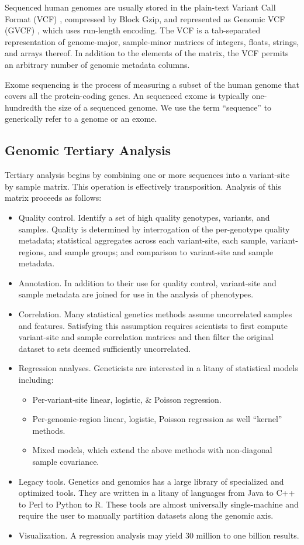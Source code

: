 \documentclass[sigconf, nonacm]{acmart}
\begin{document}
Sequenced human genomes are usually stored in the plain-text Variant Call Format (VCF) \cite{vcf4.3},
compressed by Block Gzip, and represented as Genomic VCF (GVCF) \cite{gvcf}, which uses run-length
encoding. The VCF is a tab-separated representation of genome-major, sample-minor matrices of
integers, floats, strings, and arrays thereof. In addition to the elements of the matrix, the VCF
permits an arbitrary number of genomic metadata columns.

Exome sequencing is the process of measuring a subset of the human genome that covers all the
protein-coding genes. An sequenced exome is typically one-hundredth the size of a sequenced
genome. We use the term ``sequence'' to generically refer to a genome or an exome.

\subsection{Genomic Tertiary Analysis}

Tertiary analysis begins by combining one or more sequences into a variant-site by sample
matrix. This operation is effectively transposition. Analysis of this matrix proceeds as follows:

\begin{itemize}
\item Quality control. Identify a set of high quality genotypes, variants, and samples. Quality is
  determined by interrogation of the per-genotype quality metadata; statistical aggregates across
  each variant-site, each sample, variant-regions, and sample groups; and comparison to variant-site
  and sample metadata.
\item Annotation. In addition to their use for quality control, variant-site and sample metadata are
  joined for use in the analysis of phenotypes.
\item Correlation. Many statistical genetics methods assume uncorrelated samples and
  features. Satisfying this assumption requires scientists to first compute variant-site and sample
  correlation matrices and then filter the original dataset to sets deemed sufficiently uncorrelated.
\item Regression analyses. Geneticists are interested in a litany of statistical models including:
  \begin{itemize}
  \item Per-variant-site linear, logistic, \& Poisson regression.
  \item Per-genomic-region linear, logistic, Poisson regression as well ``kernel'' methods.
  \item Mixed models, which extend the above methods with non-diagonal sample covariance.
  \end{itemize}
\item Legacy tools. Genetics and genomics has a large library of specialized and optimized
  tools. They are written in a litany of languages from Java to C++ to Perl to Python to R. These
  tools are almost universally single-machine and require the user to manually partition datasets
  along the genomic axis.
\item Visualization. A regression analysis may yield 30 million to one billion results.
\end{itemize}
\end{document}
